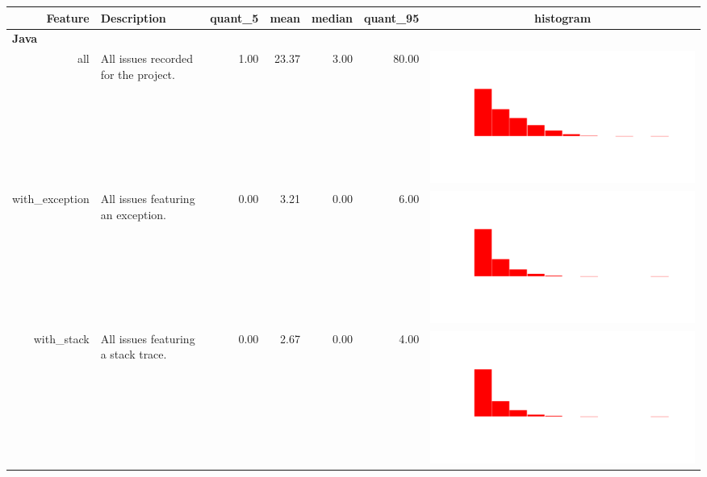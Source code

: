\begin{table}[ht]
\centering
\begin{tabular}{rp{27em}rrrrc}
  \hline
Feature & Description & quant\_5 & mean & median & quant\_95 & histogram \\ 
  \hline
   \multicolumn{2}{l}{\bfseries{Java}}  \\
all & All issues recorded for the project. & 1.00 & 23.37 & 3.00 & 80.00 & \includegraphics[scale = 0.08, clip = true, trim= 50px 70px 50px 60px]{hist-31b77719e3773ad7ac2073785de62a5f.pdf} \\ 
  with\_exception & All issues featuring an exception. & 0.00 & 3.21 & 0.00 & 6.00 & \includegraphics[scale = 0.08, clip = true, trim= 50px 70px 50px 60px]{hist-0c1305fc40f695dbdd1f4696db24f147.pdf} \\ 
  with\_stack & All issues featuring a stack trace. & 0.00 & 2.67 & 0.00 & 4.00 & \includegraphics[scale = 0.08, clip = true, trim= 50px 70px 50px 60px]{hist-896524802e915aa3f01ef1ecd2489e7e.pdf} \\ 

\end{tabular}
\end{table}
